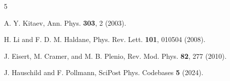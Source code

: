 \documentclass[aps,prb,reprint,superscriptaddress,amsmath,amssymb]{revtex4-2}
\begin{document}
\begin{thebibliography}{5}

A. Y. Kitaev, Ann. Phys. \textbf{303}, 2 (2003).

H. Li and F. D. M. Haldane, Phys. Rev. Lett. \textbf{101}, 010504 (2008).

J. Eisert, M. Cramer, and M. B. Plenio, Rev. Mod. Phys. \textbf{82}, 277 (2010). %

J. Hauschild and F. Pollmann, SciPost Phys. Codebases \textbf{5} (2024). %

\end{thebibliography}
\end{document}
